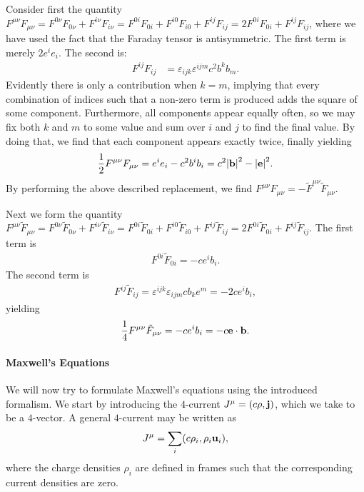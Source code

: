 Consider first the quantity $F^{\mu\nu}F_{\mu\nu} = F^{0\nu}F_{0\nu} + F^{i\nu}F_{i\nu} = F^{0i}F_{0i} + F^{i0}F_{i0} + F^{ij}F_{ij} = 2F^{0i}F_{0i} + F^{ij}F_{ij}$, where we have used the fact that the Faraday tensor is antisymmetric. The first term is merely $2e^{i}e_{i}$. The second is:
\begin{align*}
	F^{ij}F_{ij} &= \varepsilon_{ijk}\varepsilon^{ijm}c^{2}b^{k}b_{m}.
\end{align*}
Evidently there is only a contribution when $k = m$, implying that every combination of indices such that a non-zero term is produced adds the square of some component. Furthermore, all components appear equally often, so we may fix both $k$ and $m$ to some value and sum over $i$ and $j$ to find the final value. By doing that, we find that each component appears exactly twice, finally yielding
\begin{align*}
	\frac{1}{2}F^{\mu\nu}F_{\mu\nu} = e^{i}e_{i} - c^{2}b^{i}b_{i} = c^{2}\abs{\vb{b}}^{2} - \abs{\vb{e}}^{2}.
\end{align*}
By performing the above described replacement, we find $F^{\mu\nu}F_{\mu\nu} = -\tilde{F}^{\mu\nu}\tilde{F}_{\mu\nu}$.

Next we form the quantity $F^{\mu\nu}\tilde{F}_{\mu\nu} = F^{0\nu}\tilde{F}_{0\nu} + F^{i\nu}\tilde{F}_{i\nu} = F^{0i}\tilde{F}_{0i} + F^{i0}\tilde{F}_{i0} + F^{ij}\tilde{F}_{ij} = 2F^{0i}\tilde{F}_{0i} + F^{ij}\tilde{F}_{ij}$. The first term is
\begin{align*}
	F^{0i}\tilde{F}_{0i} = -ce^{i}b_{i}.
\end{align*}
The second term is
\begin{align*}
	F^{ij}\tilde{F}_{ij} = \varepsilon^{ijk}\varepsilon_{ijm}cb_{k}e^{m} = -2ce^{i}b_{i},
\end{align*}
yielding
\begin{align*}
	\frac{1}{4}F^{\mu\nu}\tilde{F}_{\mu\nu} = -ce^{i}b_{i} = -c\vb{e}\cdot\vb{b}.
\end{align*}

\paragraph{Maxwell's Equations}
We will now try to formulate Maxwell's equations using the introduced formalism. We start by introducing the $4$-current $J^{\mu} = (c\rho, \vb{j})$, which we take to be a $4$-vector. A general $4$-current may be written as
\begin{align*}
	J^{\mu} = \sum\limits_{i}(c\rho_{i}, \rho_{i}\vb{u}_{i}),
\end{align*}
where the charge densities $\rho_{i}$ are defined in frames such that the corresponding current densities are zero.

